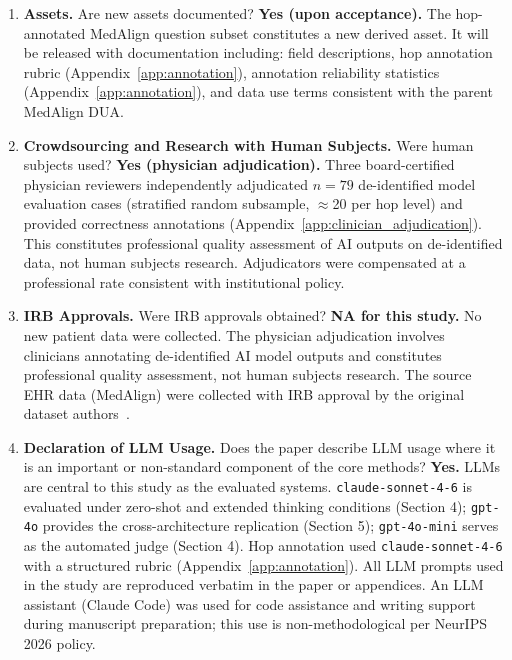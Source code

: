 \documentclass{article}
\begin{document}
\begin{enumerate}
\item \textbf{Assets.}
Are new assets documented?
\textbf{Yes (upon acceptance).} The hop-annotated MedAlign question subset
constitutes a new derived asset. It will be released with documentation
including: field descriptions, hop annotation rubric (Appendix~\ref{app:annotation}),
annotation reliability statistics (Appendix~\ref{app:annotation}), and
data use terms consistent with the parent MedAlign DUA.

\item \textbf{Crowdsourcing and Research with Human Subjects.}
Were human subjects used?
\textbf{Yes (physician adjudication).} Three board-certified physician
reviewers independently adjudicated $n = 79$ de-identified model evaluation
cases (stratified random subsample, $\approx$20 per hop level) and provided
correctness annotations (Appendix~\ref{app:clinician_adjudication}). This
constitutes professional quality assessment of AI outputs on de-identified
data, not human subjects research. Adjudicators were compensated at a
professional rate consistent with institutional policy.

\item \textbf{IRB Approvals.}
Were IRB approvals obtained?
\textbf{NA for this study.} No new patient data were collected.
The physician adjudication involves clinicians annotating de-identified AI
model outputs and constitutes professional quality assessment, not human
subjects research. The source EHR data (MedAlign) were collected with IRB
approval by the original dataset authors~\citep{wornow2024medalign}.

\item \textbf{Declaration of LLM Usage.}
Does the paper describe LLM usage where it is an important or non-standard
component of the core methods?
\textbf{Yes.} LLMs are central to this study as the evaluated systems.
\texttt{claude-sonnet-4-6} is evaluated under zero-shot and extended
thinking conditions (Section 4); \texttt{gpt-4o} provides the
cross-architecture replication (Section 5); \texttt{gpt-4o-mini} serves as
the automated judge (Section 4). Hop annotation used \texttt{claude-sonnet-4-6}
with a structured rubric (Appendix~\ref{app:annotation}). All LLM prompts
used in the study are reproduced verbatim in the paper or appendices.
An LLM assistant (Claude Code) was used for code assistance and writing
support during manuscript preparation; this use is non-methodological per
NeurIPS 2026 policy.

\end{enumerate}
\end{document}
